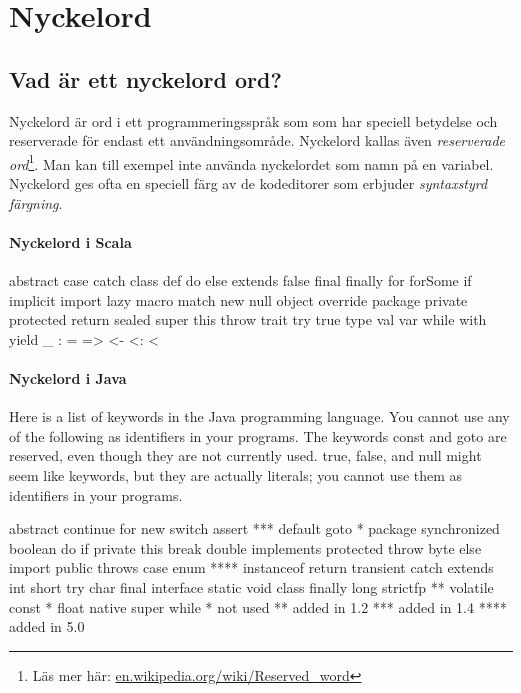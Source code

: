 
\chapter{Nyckelord}\label{appendix:keywords}

\section{Vad är ett nyckelord ord?}

Nyckelord är ord i ett programmeringsspråk som som har speciell betydelse och reserverade för endast ett användningsområde. Nyckelord kallas även \emph{reserverade ord}\footnote{Läs mer här: \href{https://en.wikipedia.org/wiki/Reserved\_word}{en.wikipedia.org/wiki/Reserved\_word}}. 
Man kan till exempel inte använda nyckelordet  som namn på en variabel. Nyckelord ges ofta en speciell färg av de kodeditorer som erbjuder \emph{syntaxstyrd färgning}. 

\subsubsection{Nyckelord i Scala} 

\begin{Code}
abstract    case        catch       class       def
do          else        extends     false       final
finally     for         forSome     if          implicit
import      lazy        macro       match       new
null        object      override    package     private
protected   return      sealed      super       this
throw       trait       try         true        type
val         var         while       with        yield
_    :    =    =>    <-    <:    <%
\end{Code}


\subsubsection{Nyckelord i Java}

Here is a list of keywords in the Java programming language. You cannot use any of the following as identifiers in your programs. The keywords const and goto are reserved, even though they are not currently used. true, false, and null might seem like keywords, but they are actually literals; you cannot use them as identifiers in your programs.

\begin{Code}[language=Java]
abstract 	continue 	for 	new 	switch
assert *** 	default 	goto * 	package 	synchronized
boolean 	do 	if 	private 	this
break 	double 	implements 	protected 	throw
byte 	else 	import 	public 	throws
case 	enum **** 	instanceof 	return 	transient
catch 	extends 	int 	short 	try
char 	final 	interface 	static 	void
class 	finally 	long 	strictfp ** 	volatile
const * 	float 	native 	super 	while
* 	  	not used
** 	  	added in 1.2
*** 	  	added in 1.4
**** 	  	added in 5.0
\end{Code}


